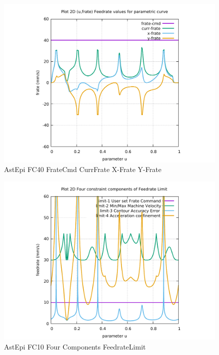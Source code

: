 \begin{figure}
	\caption     {AstEpi FC40 FrateCmd CurrFrate X-Frate Y-Frate}
	\label{30-img-AstEpi-FC40-FrateCmd-CurrFrate-X-Frate-Y-Frate.pdf}
\includegraphics[width=1.00\textwidth]{Chap4/appendix/app-AstEpi/plots/30-img-AstEpi-FC40-FrateCmd-CurrFrate-X-Frate-Y-Frate.pdf}
\end{figure}


\clearpage
\pagebreak

\begin{figure}
	\caption     {AstEpi FC10 Four Components FeedrateLimit}
	\label{31-img-AstEpi-FC10-Four-Components-FeedrateLimit.pdf}
\includegraphics[width=1.00\textwidth]{Chap4/appendix/app-AstEpi/plots/31-img-AstEpi-FC10-Four-Components-FeedrateLimit.pdf}
\end{figure}



